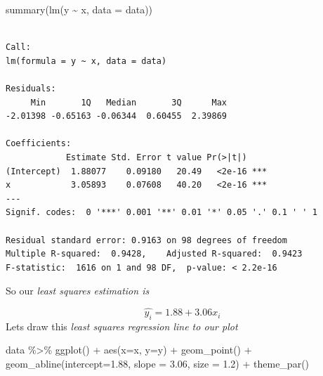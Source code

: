 \documentclass[
  letterpaper,
  DIV=11,
  numbers=noendperiod]{scrreprt}
\newenvironment{Shaded}{\begin{snugshade}}{\end{snugshade}}
\newcommand{\AttributeTok}[1]{\textcolor[rgb]{0.65,0.35,0.00}{#1}}
\newcommand{\FloatTok}[1]{\textcolor[rgb]{0.65,0.35,0.00}{#1}}
\newcommand{\FunctionTok}[1]{\textcolor[rgb]{0.02,0.16,0.49}{#1}}
\newcommand{\NormalTok}[1]{\textcolor[rgb]{0.33,0.33,0.33}{#1}}
\newcommand{\SpecialCharTok}[1]{\textcolor[rgb]{0.00,0.46,0.62}{#1}}
\begin{document}
\begin{Shaded}
\begin{Highlighting}[]
\FunctionTok{summary}\NormalTok{(}\FunctionTok{lm}\NormalTok{(y }\SpecialCharTok{\textasciitilde{}}\NormalTok{ x, }\AttributeTok{data =}\NormalTok{ data))}
\end{Highlighting}
\end{Shaded}

\begin{verbatim}

Call:
lm(formula = y ~ x, data = data)

Residuals:
     Min       1Q   Median       3Q      Max 
-2.01398 -0.65163 -0.06344  0.60455  2.39869 

Coefficients:
            Estimate Std. Error t value Pr(>|t|)    
(Intercept)  1.88077    0.09180   20.49   <2e-16 ***
x            3.05893    0.07608   40.20   <2e-16 ***
---
Signif. codes:  0 '***' 0.001 '**' 0.01 '*' 0.05 '.' 0.1 ' ' 1

Residual standard error: 0.9163 on 98 degrees of freedom
Multiple R-squared:  0.9428,    Adjusted R-squared:  0.9423 
F-statistic:  1616 on 1 and 98 DF,  p-value: < 2.2e-16
\end{verbatim}

So our \emph{least squares estimation is}

\[
\hat{y_i} = 1.88 + 3.06 x_i
\] Lets draw this \emph{least squares regression line to our plot}

\begin{Shaded}
\begin{Highlighting}[]
\NormalTok{data }\SpecialCharTok{\%\textgreater{}\%} 
  \FunctionTok{ggplot}\NormalTok{() }\SpecialCharTok{+} \FunctionTok{aes}\NormalTok{(}\AttributeTok{x=}\NormalTok{x, }\AttributeTok{y=}\NormalTok{y) }\SpecialCharTok{+} \FunctionTok{geom\_point}\NormalTok{() }\SpecialCharTok{+} \FunctionTok{geom\_abline}\NormalTok{(}\AttributeTok{intercept=}\FloatTok{1.88}\NormalTok{, }\AttributeTok{slope =} \FloatTok{3.06}\NormalTok{, }\AttributeTok{size =} \FloatTok{1.2}\NormalTok{) }\SpecialCharTok{+} \FunctionTok{theme\_par}\NormalTok{()}
\end{Highlighting}
\end{Shaded}
\end{document}

